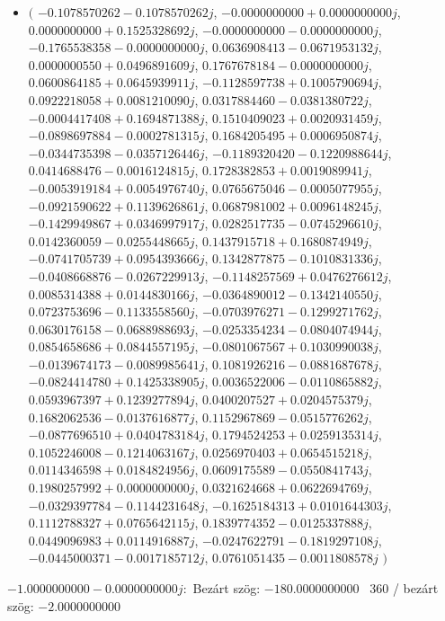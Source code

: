 \documentclass[14pt,a4paper]{article}
\begin{document}
\begin{itemize}
\item
$\big($
$-0.1078570262-0.1078570262j$, $-0.0000000000+0.0000000000j$, $0.0000000000+0.1525328692j$, $-0.0000000000-0.0000000000j$, $-0.1765538358-0.0000000000j$, $0.0636908413-0.0671953132j$, $0.0000000550+0.0496891609j$, $0.1767678184-0.0000000000j$, $0.0600864185+0.0645939911j$, $-0.1128597738+0.1005790694j$, $0.0922218058+0.0081210090j$, $0.0317884460-0.0381380722j$, $-0.0004417408+0.1694871388j$, $0.1510409023+0.0020931459j$, $-0.0898697884-0.0002781315j$, $0.1684205495+0.0006950874j$, $-0.0344735398-0.0357126446j$, $-0.1189320420-0.1220988644j$, $0.0414688476-0.0016124815j$, $0.1728382853+0.0019089941j$, $-0.0053919184+0.0054976740j$, $0.0765675046-0.0005077955j$, $-0.0921590622+0.1139626861j$, $0.0687981002+0.0096148245j$, $-0.1429949867+0.0346997917j$, $0.0282517735-0.0745296610j$, $0.0142360059-0.0255448665j$, $0.1437915718+0.1680874949j$, $-0.0741705739+0.0954393666j$, $0.1342877875-0.1010831336j$, $-0.0408668876-0.0267229913j$, $-0.1148257569+0.0476276612j$, $0.0085314388+0.0144830166j$, $-0.0364890012-0.1342140550j$, $0.0723753696-0.1133558560j$, $-0.0703976271-0.1299271762j$, $0.0630176158-0.0688988693j$, $-0.0253354234-0.0804074944j$, $0.0854658686+0.0844557195j$, $-0.0801067567+0.1030990038j$, $-0.0139674173-0.0089985641j$, $0.1081926216-0.0881687678j$, $-0.0824414780+0.1425338905j$, $0.0036522006-0.0110865882j$, $0.0593967397+0.1239277894j$, $0.0400207527+0.0204575379j$, $0.1682062536-0.0137616877j$, $0.1152967869-0.0515776262j$, $-0.0877696510+0.0404783184j$, $0.1794524253+0.0259135314j$, $0.1052246008-0.1214063167j$, $0.0256970403+0.0654515218j$, $0.0114346598+0.0184824956j$, $0.0609175589-0.0550841743j$, $0.1980257992+0.0000000000j$, $0.0321624668+0.0622694769j$, $-0.0329397784-0.1144231648j$, $-0.1625184313+0.0101644303j$, $0.1112788327+0.0765642115j$, $0.1839774352-0.0125337888j$, $0.0449096983+0.0114916887j$, $-0.0247622791-0.1819297108j$, $-0.0445000371-0.0017185712j$, $0.0761051435-0.0011808578j$
$\big)$
\end{itemize}
$-1.0000000000-0.0000000000j$:\
Bezárt szög: $-180.0000000000$ \
360 / bezárt szög: $-2.0000000000$\
\end{document}
